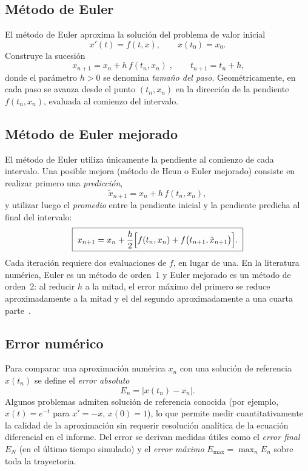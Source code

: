 \documentclass[11pt,a4paper]{article}
\begin{document}
\subsection{Método de Euler}
\label{sec:marco-euler}

El método de Euler aproxima la solución del problema de valor inicial
\begin{equation}
  x'(t) = f(t, x), \qquad x(t_0) = x_0.
\end{equation}
Construye la sucesión
\begin{equation}
  \boxed{\; x_{n+1} = x_n + h\, f(t_n, x_n) \;},
  \qquad t_{n+1} = t_n + h,
  \label{eq:euler}
\end{equation}
donde el parámetro $h > 0$ se denomina \emph{tamaño del paso}. Geométricamente,
en cada paso se avanza desde el punto $(t_n, x_n)$ en la dirección de la
pendiente $f(t_n, x_n)$, evaluada al comienzo del intervalo.

\subsection{Método de Euler mejorado}
\label{sec:marco-mejorado}

El método de Euler utiliza únicamente la pendiente al comienzo de cada
intervalo. Una posible mejora (método de Heun o Euler mejorado) consiste en
realizar primero una \emph{predicción},
\begin{equation}
  \tilde{x}_{n+1} = x_n + h\, f(t_n, x_n),
\end{equation}
y utilizar luego el \emph{promedio} entre la pendiente inicial y la pendiente
predicha al final del intervalo:
\begin{equation}
  \boxed{\;
    x_{n+1} = x_n + \frac{h}{2}\Bigl[f(t_n, x_n) + f\bigl(t_{n+1},
    \tilde{x}_{n+1}\bigr)\Bigr].
  \;}
  \label{eq:euler-mejorado}
\end{equation}
Cada iteración requiere dos evaluaciones de $f$, en lugar de una. En la
literatura numérica, Euler es un método de orden~1 y Euler mejorado es un
método de orden~2: al reducir $h$ a la mitad, el error máximo del primero se
reduce aproximadamente a la mitad y el del segundo aproximadamente a una
cuarta parte~\cite{burden2016}.

\subsection{Error numérico}
\label{sec:marco-error}

Para comparar una aproximación numérica $x_n$ con una solución de referencia
$x(t_n)$ se define el \emph{error absoluto}
\begin{equation}
  E_n = \bigl| x(t_n) - x_n \bigr|.
  \label{eq:error}
\end{equation}
Algunos problemas admiten solución de referencia conocida (por ejemplo,
$x(t) = e^{-t}$ para $x' = -x$, $x(0)=1$), lo que permite medir cuantitativamente
la calidad de la aproximación sin requerir resolución analítica de la ecuación
diferencial en el informe. Del error se derivan medidas útiles como el
\emph{error final} $E_N$ (en el último tiempo simulado) y el \emph{error
máximo} $E_{\max} = \max_n E_n$ sobre toda la trayectoria.
\end{document}
